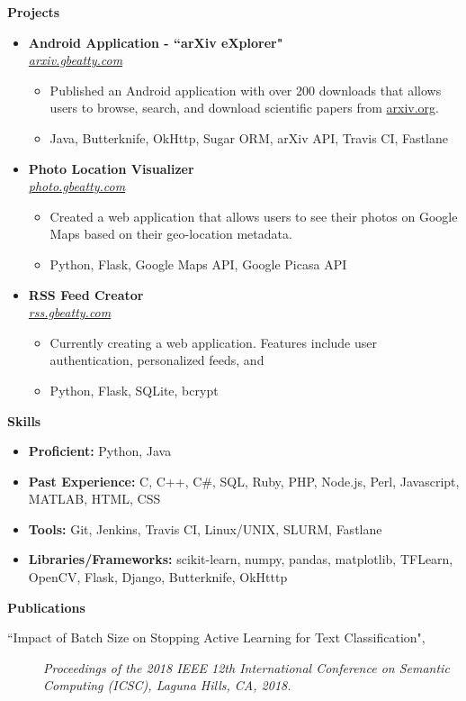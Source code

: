 \documentclass[letterpaper,10pt]{article}
\newcommand{\resitem}[1]{\item #1 \vspace{-2pt}}
\newcommand{\resheading}[1]{{\large \colorbox{mygrey}{\begin{minipage}{\textwidth}{\textbf{#1 \vphantom{p\^{E}}}}\end{minipage}}}}
\newcommand{\ressubheading}[4]{%
  \item\textbf{#1} \hfill #2\null\\
  \textit{#3} \hfill \textit{#4}%
  \vspace{-5pt}
}%
\begin{document}
\resheading{Projects}
\begin{itemize}

\ressubheading{Android Application - ``arXiv eXplorer"}{}{\href{http://arxiv.gbeatty.com}{arxiv.gbeatty.com}}{}
	\begin{itemize}
		\resitem{Published an Android application with over 200 downloads that allows users to browse, search, and download scientific papers from \href{http://arxiv.org}{arxiv.org}.}
		\resitem{Java, Butterknife, OkHttp, Sugar ORM, arXiv API, Travis CI, Fastlane}
	\end{itemize}
	

\ressubheading{Photo Location Visualizer}{}{\href{http://photo.gbeatty.com}{photo.gbeatty.com}}{}
	\begin{itemize}
		\resitem{Created a web application that allows users to see their photos on Google Maps based on their geo-location metadata.}
		\resitem{Python, Flask, Google Maps API, Google Picasa API}
	\end{itemize}


\ressubheading{RSS Feed Creator}{}{\href{http://rss.gbeatty.com/}{rss.gbeatty.com}}{}
	\begin{itemize}
		\resitem{Currently creating a web application. Features include user authentication, personalized feeds, and }
		\resitem{Python, Flask, SQLite, bcrypt}
	\end{itemize}

\end{itemize}

\resheading{Skills}
	\begin{itemize}
	\resitem{\textbf{Proficient:} Python, Java}
	\resitem{\textbf{Past Experience:} C, C++, C\#, SQL, Ruby, PHP, Node.js, Perl, Javascript, MATLAB, HTML, CSS}
	\resitem{\textbf{Tools:} Git, Jenkins, Travis CI, Linux/UNIX, SLURM, Fastlane}
	\resitem{\textbf{Libraries/Frameworks:} scikit-learn, numpy, pandas, matplotlib, TFLearn, OpenCV, Flask, Django, Butterknife, OkHtttp}
	\end{itemize}

\resheading{Publications}
\begin{description}
\item[``Impact of Batch Size on Stopping Active Learning for Text Classification",]
\emph{Proceedings of the 2018 IEEE 12th International Conference on Semantic Computing (ICSC), Laguna Hills, CA, 2018.}
\end{description}
\end{document}
